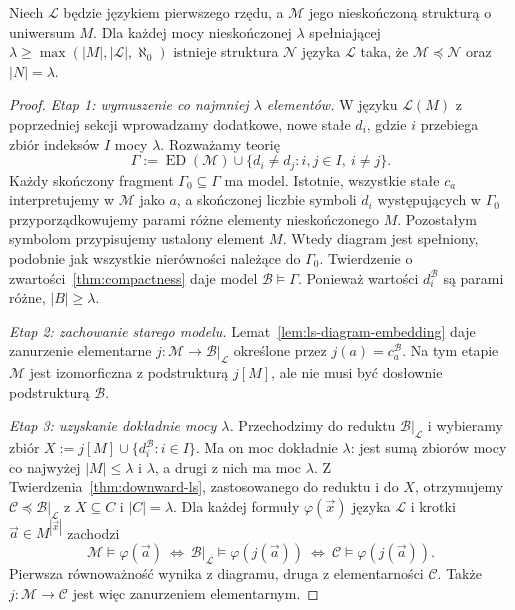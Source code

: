 \begin{twierdzenie}
\label{thm:upward-ls}
Niech $\mathcal L$ będzie językiem pierwszego rzędu,
a $\mathcal M$ jego nieskończoną strukturą
o uniwersum $M$. Dla każdej mocy nieskończonej
$\lambda$ spełniającej
$\lambda\ge\max(|M|,|\mathcal L|,\aleph_0)$
istnieje struktura $\mathcal N$ języka $\mathcal L$
taka, że $\mathcal M\preccurlyeq\mathcal N$
oraz $|N|=\lambda$.
\end{twierdzenie}
\begin{proof}
\emph{Etap 1: wymuszenie co najmniej $\lambda$ elementów.}
W języku $\mathcal L(M)$ z poprzedniej sekcji
wprowadzamy dodatkowe, nowe stałe $d_i$,
gdzie $i$ przebiega zbiór indeksów $I$ mocy $\lambda$.
Rozważamy teorię
\[
\Gamma:=\operatorname{ED}(\mathcal M)
\cup\{d_i\ne d_j:i,j\in I,\ i\ne j\}.
\]
Każdy skończony fragment $\Gamma_0\subseteq\Gamma$
ma model. Istotnie, wszystkie stałe $c_a$
interpretujemy w $\mathcal M$ jako $a$, a skończonej
liczbie symboli $d_i$ występujących w $\Gamma_0$
przyporządkowujemy parami różne elementy
nieskończonego $M$. Pozostałym symbolom
przypisujemy ustalony element $M$.
Wtedy diagram jest spełniony, podobnie jak
wszystkie nierówności należące do $\Gamma_0$.
Twierdzenie o zwartości~\ref{thm:compactness}
daje model $\mathcal B\models\Gamma$.
Ponieważ wartości $d_i^{\mathcal B}$
są parami różne, $|B|\ge\lambda$.

\emph{Etap 2: zachowanie starego modelu.}
Lemat~\ref{lem:ls-diagram-embedding}
daje zanurzenie elementarne
$j:\mathcal M\to\mathcal B|_{\mathcal L}$
określone przez $j(a)=c_a^{\mathcal B}$.
Na tym etapie $\mathcal M$ jest izomorficzna
z podstrukturą $j[M]$, ale nie musi być
dosłownie podstrukturą $\mathcal B$.

\emph{Etap 3: uzyskanie dokładnie mocy $\lambda$.}
Przechodzimy do reduktu
$\mathcal B|_{\mathcal L}$ i wybieramy
zbiór $X:=j[M]\cup\{d_i^{\mathcal B}:i\in I\}$.
Ma on moc dokładnie $\lambda$:
jest sumą zbiorów mocy co najwyżej
$|M|\le\lambda$ i $\lambda$,
a drugi z nich ma moc $\lambda$.
Z Twierdzenia~\ref{thm:downward-ls},
zastosowanego do reduktu i do $X$,
otrzymujemy $\mathcal C\preccurlyeq
\mathcal B|_{\mathcal L}$
z $X\subseteq C$ i $|C|=\lambda$.
Dla każdej formuły $\varphi(\vec x)$
języka $\mathcal L$ i krotki $\vec a\in M^{|\vec x|}$
zachodzi
\[
\mathcal M\models\varphi(\vec a)
\ \Longleftrightarrow\
\mathcal B|_{\mathcal L}\models\varphi(j(\vec a))
\ \Longleftrightarrow\
\mathcal C\models\varphi(j(\vec a)).
\]
Pierwsza równoważność wynika z diagramu,
druga z elementarności $\mathcal C$.
Także $j:\mathcal M\to\mathcal C$
jest więc zanurzeniem elementarnym.


\end{proof}

